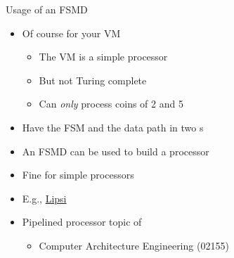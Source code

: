 


\begin{frame}[fragile]{Usage of an FSMD}
\begin{itemize}
\item Of course for your VM
\begin{itemize}
\item The VM is a simple processor
\item But not Turing complete
\item Can \emph{only} process coins of 2 and 5
\end{itemize}
\item Have the FSM and the data path in two s
\item An FSMD can be used to build a processor
\item Fine for simple processors
\item E.g., \href{https://github.com/schoeberl/lipsi}{Lipsi}
\item Pipelined processor topic of
\begin{itemize}
\item Computer Architecture Engineering (02155)
\end{itemize}\end{itemize}
\end{frame}

